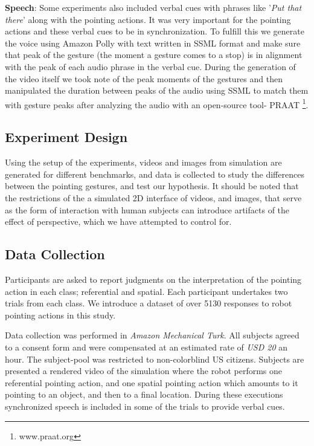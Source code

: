

\noindent\textbf{Speech}: Some experiments also included verbal cues with phrases like '\textit{Put that there}' along with the pointing actions. It was very important for the pointing actions and these verbal cues to be in synchronization. To fulfill this we generate the voice using Amazon Polly with text written in SSML format and make sure that peak of the gesture (the moment a gesture comes to a stop) is in alignment with the peak of each audio phrase in the verbal cue. During the generation of the video itself we took note of the peak moments of the gestures and then manipulated the duration between peaks of the audio using SSML to match them with gesture peaks after analyzing the audio with an open-source tool- PRAAT \footnote{www.praat.org}.


\subsection{Experiment Design}

Using the setup of the experiments, videos and images from simulation are generated for different benchmarks, and data is collected to study the differences between the pointing gestures, and test our hypothesis. It should be noted that the restrictions of the a simulated 2D interface of videos, and images, that serve as the form of interaction with human subjects can introduce artifacts of the effect of perspective, which we have attempted to control for.  

\subsection{Data Collection}


Participants are asked to report judgments on the interpretation of the pointing action in each class; referential and spatial.  Each participant undertakes two trials from each class. We introduce a dataset of over 5130 responses to robot pointing actions in this study.

Data collection was performed in \textit{Amazon Mechanical Turk}.
All subjects agreed to a consent form and were compensated at an estimated rate of \textit{USD 20} an hour. The subject-pool was restricted to non-colorblind US citizens. Subjects are presented a rendered video of the simulation where the robot performs one referential pointing action, and one spatial pointing action which amounts to it pointing to an object, and then to a final location. During these executions synchronized speech is included in some of the trials to provide verbal cues.

